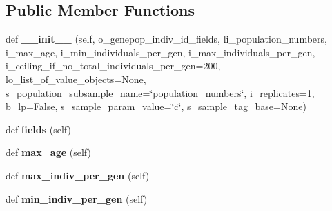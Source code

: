 \subsection*{Public Member Functions}
\begin{DoxyCompactItemize}
\item 
def {\bfseries \+\_\+\+\_\+init\+\_\+\+\_\+} (self, o\+\_\+genepop\+\_\+indiv\+\_\+id\+\_\+fields, li\+\_\+population\+\_\+numbers, i\+\_\+max\+\_\+age, i\+\_\+min\+\_\+individuals\+\_\+per\+\_\+gen, i\+\_\+max\+\_\+individuals\+\_\+per\+\_\+gen, i\+\_\+ceiling\+\_\+if\+\_\+no\+\_\+total\+\_\+individuals\+\_\+per\+\_\+gen=200, lo\+\_\+list\+\_\+of\+\_\+value\+\_\+objects=None, s\+\_\+population\+\_\+subsample\+\_\+name=\char`\"{}population\+\_\+numbers\char`\"{}, i\+\_\+replicates=1, b\+\_\+lp=False, s\+\_\+sample\+\_\+param\+\_\+value=\char`\"{}c\char`\"{}, s\+\_\+sample\+\_\+tag\+\_\+base=None)\hypertarget{classnegui_1_1genepopfilesampler_1_1GenepopFileSampleParamsCohorts_a8c6f8f53989fc1cc18a79f89a279eb62}{}\label{classnegui_1_1genepopfilesampler_1_1GenepopFileSampleParamsCohorts_a8c6f8f53989fc1cc18a79f89a279eb62}

\item 
def {\bfseries fields} (self)\hypertarget{classnegui_1_1genepopfilesampler_1_1GenepopFileSampleParamsCohorts_abba7631b882eb94c9edc982e967e2ef2}{}\label{classnegui_1_1genepopfilesampler_1_1GenepopFileSampleParamsCohorts_abba7631b882eb94c9edc982e967e2ef2}

\item 
def {\bfseries max\+\_\+age} (self)\hypertarget{classnegui_1_1genepopfilesampler_1_1GenepopFileSampleParamsCohorts_a7c54d868b019effd0216b544888fb24d}{}\label{classnegui_1_1genepopfilesampler_1_1GenepopFileSampleParamsCohorts_a7c54d868b019effd0216b544888fb24d}

\item 
def {\bfseries max\+\_\+indiv\+\_\+per\+\_\+gen} (self)\hypertarget{classnegui_1_1genepopfilesampler_1_1GenepopFileSampleParamsCohorts_a4cbf01034bb340089a3f8608208ef201}{}\label{classnegui_1_1genepopfilesampler_1_1GenepopFileSampleParamsCohorts_a4cbf01034bb340089a3f8608208ef201}

\item 
def {\bfseries min\+\_\+indiv\+\_\+per\+\_\+gen} (self)\hypertarget{classnegui_1_1genepopfilesampler_1_1GenepopFileSampleParamsCohorts_a975ed34ec7031079d5159277e028e071}{}\label{classnegui_1_1genepopfilesampler_1_1GenepopFileSampleParamsCohorts_a975ed34ec7031079d5159277e028e071}


\end{DoxyCompactItemize}
